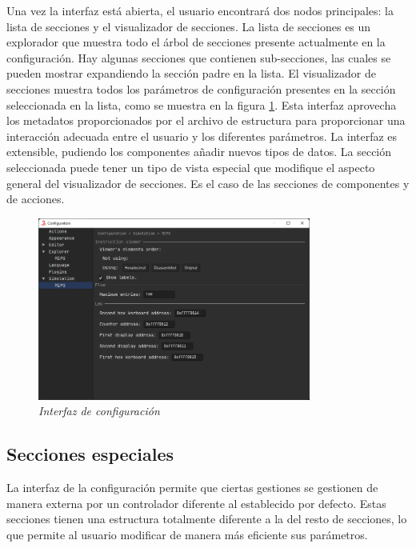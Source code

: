 Una vez la interfaz está abierta, el usuario encontrará dos nodos principales:
la lista de secciones y el visualizador de secciones.
La lista de secciones es un explorador que muestra todo el árbol de
secciones presente actualmente en la configuración.
Hay algunas secciones que contienen sub-secciones, las cuales se pueden
mostrar expandiendo la sección padre en la lista.
El visualizador de secciones muestra todos los parámetros de configuración
presentes en la sección seleccionada en la lista, como se muestra en la
figura \ref{fig:jams-configuracion}.
Esta interfaz aprovecha los metadatos proporcionados por el archivo
de estructura para proporcionar una interacción adecuada entre el usuario
y los diferentes parámetros.
La interfaz es extensible, pudiendo los componentes añadir nuevos tipos de datos.
La sección seleccionada puede tener un tipo de vista especial
que modifique el aspecto general del visualizador de secciones.
Es el caso de las secciones de componentes y de acciones.

\begin{figure}[H]
    \centering
    \includegraphics[width=0.8\textwidth]{images/base/jams-config}
    \caption{\textit{Interfaz de configuración}}
    \label{fig:jams-configuracion}
\end{figure}

\subsection{Secciones especiales}\label{subsec:secciones-especiales}

La interfaz de la configuración permite que ciertas gestiones se
gestionen de manera externa por un controlador diferente al establecido
por defecto.
Estas secciones tienen una estructura totalmente diferente a la
del resto de secciones, lo que permite al usuario modificar
de manera más eficiente sus parámetros.



